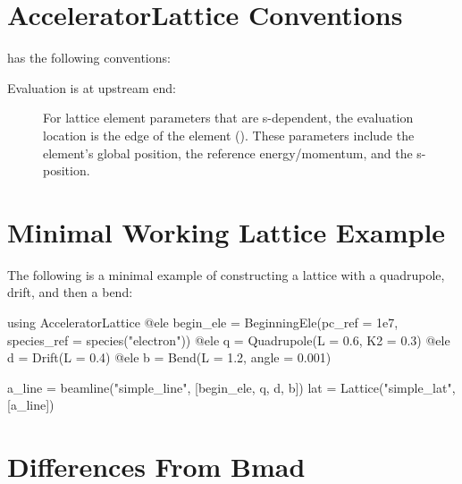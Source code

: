 \section{AcceleratorLattice Conventions}
\label{s:conventions}

\accellat has the following conventions:
\begin{description}
%
\item[Evaluation is at upstream end:] 
For lattice element parameters that are s-dependent, the evaluation location is the
 edge of the element (). These parameters include the 
element's global position, the reference energy/momentum, and the s-position.
%
\end{description}

\section{Minimal Working Lattice Example}
\label{s:min.lat}

The following is a minimal example of constructing a lattice with a quadrupole, drift, and then
a bend:
\begin{example}
  using AcceleratorLattice
  @ele begin_ele = BeginningEle(pc_ref = 1e7, species_ref = species("electron"))
  @ele q = Quadrupole(L = 0.6, K2 = 0.3)
  @ele d = Drift(L = 0.4)
  @ele b = Bend(L = 1.2, angle = 0.001)

  a_line = beamline("simple_line", [begin_ele, q, d, b])
  lat = Lattice("simple_lat", [a_line])
\end{example}

\section{Differences From Bmad}

